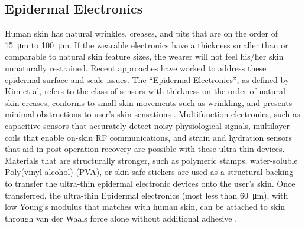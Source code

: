 \documentclass{sigchi}
\begin{document}


\subsection{Epidermal Electronics}
Human skin has natural wrinkles, creases, and pits that are on the order of \SI{15}{\micro\metre} to \SI{100}{\micro\metre}\cite{Tchvialeva:2014wla}. If the wearable electronics have a thickness smaller than or comparable to natural skin feature sizes, the wearer will not feel his/her skin unnaturally restrained\cite{Kim:2011bv}. Recent approaches have worked to address these epidermal surface and scale issues. The “Epidermal Electronics”, as defined by Kim et al, refers to the class of sensors with thickness on the order of natural skin creases, conforms to small skin movements such as wrinkling, and presents minimal obstructions to user's skin sensations \cite{Kim:2011bv}. Multifunction electronics, such as capacitive sensors that accurately detect noisy physiological signals, multilayer coils that enable on-skin RF communications, and strain and hydration sensors that aid in post-operation recovery\cite{Jeong:2013km,Kim:2014iq,Bandodkar:2014dl,Kim:2011bv} are possible with these ultra-thin devices. Materials that are structurally stronger, such as polymeric stamps, water-soluble Poly(vinyl alcohol) (PVA), or skin-safe stickers are used as a structural backing to transfer the ultra-thin epidermal electronic devices onto the user's skin\cite{Son:2014iya}. Once transferred, the ultra-thin Epidermal electronics (most less than \SI{60}{\micro\metre}), with low Young's modulus that matches with human skin, can be attached to skin through van der Waals force alone without additional adhesive \cite{Son:2014iya,Kim:2011bv}. 
\end{document}
